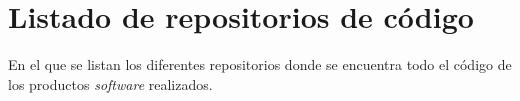 \chapter{Listado de repositorios de código}

\begin{elements}
En el que se listan los diferentes repositorios donde se encuentra todo el código de los productos \textit{software} realizados.
\end{elements}
